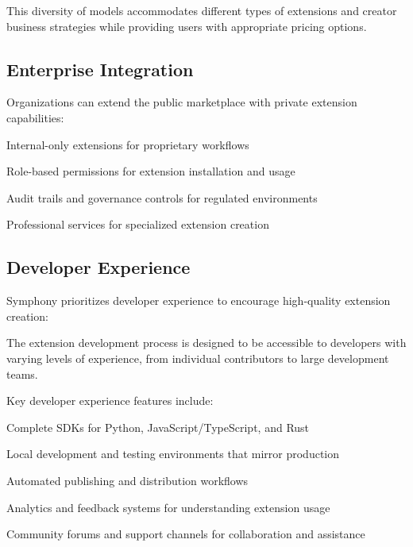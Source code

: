 This diversity of models accommodates different types of extensions and creator business strategies while providing users with appropriate pricing options.

\subsection*{Enterprise Integration}

Organizations can extend the public marketplace with private extension capabilities:

\begin{description}[leftmargin=4cm,labelwidth=3.5cm]
    \item[\textbf{Private Registries}] Internal-only extensions for proprietary workflows
    \item[\textbf{Access Control}] Role-based permissions for extension installation and usage
    \item[\textbf{Compliance}] Audit trails and governance controls for regulated environments
    \item[\textbf{Custom Development}] Professional services for specialized extension creation
\end{description}

\subsection*{Developer Experience}

Symphony prioritizes developer experience to encourage high-quality extension creation:

\begin{alertbox}
The extension development process is designed to be accessible to developers with varying levels of experience, from individual contributors to large development teams.
\end{alertbox}

Key developer experience features include:

\begin{compactlist}
    \item Complete SDKs for Python, JavaScript/TypeScript, and Rust
    \item Local development and testing environments that mirror production
    \item Automated publishing and distribution workflows
    \item Analytics and feedback systems for understanding extension usage
    \item Community forums and support channels for collaboration and assistance
\end{compactlist}

